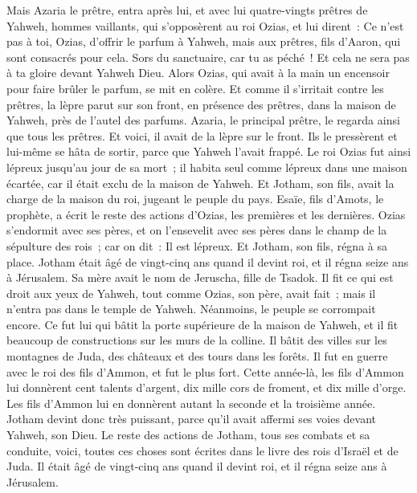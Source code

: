 \begin{multicols}{2}
Mais Azaria le prêtre, entra après lui, et avec lui quatre-vingts prêtres de Yahweh, hommes vaillants,
qui s'opposèrent au roi Ozias, et lui dirent~: Ce n'est pas à toi, Ozias, d'offrir le parfum à Yahweh, mais aux prêtres, fils d'Aaron, qui sont consacrés pour cela. Sors du sanctuaire, car tu as péché~! Et cela ne sera pas à ta gloire devant Yahweh Dieu.
Alors Ozias, qui avait à la main un encensoir pour faire brûler le parfum, se mit en colère. Et comme il s'irritait contre les prêtres, la lèpre parut sur son front, en présence des prêtres, dans la maison de Yahweh, près de l'autel des parfums.
Azaria, le principal prêtre, le regarda ainsi que tous les prêtres. Et voici, il avait de la lèpre sur le front. Ils le pressèrent et lui-même se hâta de sortir, parce que Yahweh l'avait frappé.
Le roi Ozias fut ainsi lépreux jusqu'au jour de sa mort~; il habita seul comme lépreux dans une maison écartée, car il était exclu de la maison de Yahweh. Et Jotham, son fils, avait la charge de la maison du roi, jugeant le peuple du pays.
Esaïe, fils d'Amots, le prophète, a écrit le reste des actions d'Ozias, les premières et les dernières.
Ozias s'endormit avec ses pères, et on l'ensevelit avec ses pères dans le champ de la sépulture des rois~; car on dit~: Il est lépreux. Et Jotham, son fils, régna à sa place.
\VerseOne{}Jotham était âgé de vingt-cinq ans quand il devint roi, et il régna seize ans à Jérusalem. Sa mère avait le nom de Jeruscha, fille de Tsadok.
Il fit ce qui est droit aux yeux de Yahweh, tout comme Ozias, son père, avait fait~; mais il n'entra pas dans le temple de Yahweh. Néanmoins, le peuple se corrompait encore.
Ce fut lui qui bâtit la porte supérieure de la maison de Yahweh, et il fit beaucoup de constructions sur les murs de la colline.
Il bâtit des villes sur les montagnes de Juda, des châteaux et des tours dans les forêts.
Il fut en guerre avec le roi des fils d'Ammon, et fut le plus fort. Cette année-là, les fils d'Ammon lui donnèrent cent talents d'argent, dix mille cors de froment, et dix mille d'orge. Les fils d'Ammon lui en donnèrent autant la seconde et la troisième année.
Jotham devint donc très puissant, parce qu'il avait affermi ses voies devant Yahweh, son Dieu.
Le reste des actions de Jotham, tous ses combats et sa conduite, voici, toutes ces choses sont écrites dans le livre des rois d'Israël et de Juda.
Il était âgé de vingt-cinq ans quand il devint roi, et il régna seize ans à Jérusalem.

\end{multicols}
